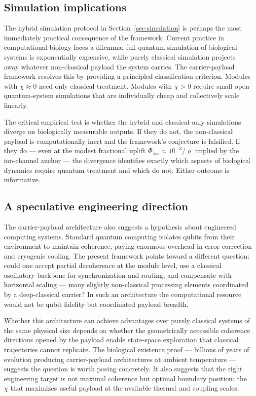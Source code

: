 \documentclass[11pt,a4paper]{article}
\theoremstyle{definition}
\theoremstyle{remark}
\begin{document}
\subsection{Simulation implications}

The hybrid simulation protocol in Section~\ref{sec:simulation} is perhaps the most immediately practical consequence of the framework. Current practice in computational biology faces a dilemma: full quantum simulation of biological systems is exponentially expensive, while purely classical simulation projects away whatever non-classical payload the system carries. The carrier-payload framework resolves this by providing a principled classification criterion. Modules with $\chi\approx 0$ need only classical treatment. Modules with $\chi > 0$ require small open-quantum-system simulations that are individually cheap and collectively scale linearly.

The critical empirical test is whether the hybrid and classical-only simulations diverge on biologically measurable outputs. If they do not, the non-classical payload is computationally inert and the framework's conjecture is falsified. If they do --- even at the modest fractional uplift $\Phi_{\mathrm{ion}} \approx 10^{-3}/\varrho$ implied by the ion-channel anchor --- the divergence identifies exactly which aspects of biological dynamics require quantum treatment and which do not. Either outcome is informative.

\subsection{A speculative engineering direction}

The carrier-payload architecture also suggests a hypothesis about engineered computing systems. Standard quantum computing isolates qubits from their environment to maintain coherence, paying enormous overhead in error correction and cryogenic cooling. The present framework points toward a different question: could one accept partial decoherence at the module level, use a classical oscillatory backbone for synchronization and routing, and compensate with horizontal scaling --- many slightly non-classical processing elements coordinated by a deep-classical carrier? In such an architecture the computational resource would not be qubit fidelity but coordinated payload breadth.

Whether this architecture can achieve advantages over purely classical systems of the same physical size depends on whether the geometrically accessible coherence directions opened by the payload enable state-space exploration that classical trajectories cannot replicate. The biological existence proof --- billions of years of evolution producing carrier-payload architectures at ambient temperature --- suggests the question is worth posing concretely. It also suggests that the right engineering target is not maximal coherence but optimal boundary position: the $\chi$ that maximizes useful payload at the available thermal and coupling scales.
\end{document}
